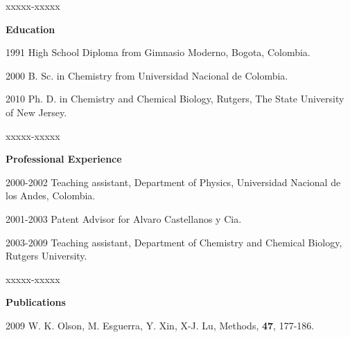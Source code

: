 \begin{vita}
 \vspace{15pt}
\begin{descriptionlist}{xxxxx-xxxxx} %
\item[{\bf Education}] \mbox{}
\item[1991] High School Diploma from Gimnasio Moderno, Bogota, Colombia.
\item[2000] B. Sc. in Chemistry from Universidad Nacional de Colombia.
\item[2010]  Ph. D. in  Chemistry and  Chemical Biology,  Rutgers, The
  State University of New Jersey.
\end{descriptionlist}
\medskip
\begin{descriptionlist}{xxxxx-xxxxx} %
\item[{\bf Professional Experience}] \mbox{}
\item[2000-2002] Teaching assistant, Department of Physics, Universidad
  Nacional de los Andes, Colombia.
\item[2001-2003] Patent Advisor for Alvaro Castellanos y Cia.
\item[2003-2009] Teaching assistant, Department of Chemistry and
  Chemical Biology, Rutgers University.
\end{descriptionlist}
\medskip
\begin{descriptionlist}{xxxxx-xxxxx} %
\item[{\bf Publications}] \mbox{}
\item[2009]  W. K.  Olson,  M.  Esguerra, Y.  Xin,  X-J. Lu,  Methods,
  \textbf{47}, 177-186.
\end{descriptionlist}

\end{vita} 



